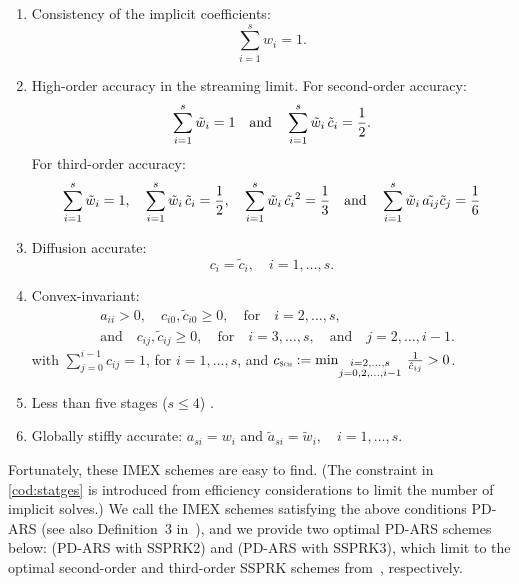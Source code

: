 \begin{enumerate}
    \item Consistency of the implicit coefficients:
    \begin{equation}
      \sum_{i=1}^{s}w_{i}=1.
    \end{equation}
    \item High-order accuracy in the streaming limit.
    For second-order accuracy:
    \begin{equation}
      \sum_{i=1}^{s}\tilde{w}_{i}=1
      \quad\text{and}\quad
      \sum_{i=1}^{s}\tilde{w}_{i}\,\tilde{c}_{i}=\frac{1}{2}.
      \label{eq:orderConditionsEx}
    \end{equation}
    For third-order accuracy: 
    \begin{equation}
    \sum_{i=1}^{s}\tilde{w}_{i}=1,
          \quad
          \sum_{i=1}^{s}\tilde{w}_{i}\,\tilde{c}_{i}=\frac{1}{2},
          \quad
          \sum_{i=1}^{s}\tilde{w}_{i}\,\tilde{c_{i}}^2 = \frac{1}{3}
          \quad\text{and}\quad
          \sum_{i=1}^{s}\tilde{w}_{i}\,\tilde{a_{ij}}\tilde{c}_{j}= \frac{1}{6}
    \end{equation}
    \item Diffusion accurate:
    \begin{equation}
      c_{i}=\tilde{c}_{i}, \quad i=1,\ldots,s.
      \label{eq:diffusionCondition}
    \end{equation}
    \item Convex-invariant:
    \begin{align}
      &a_{ii}>0, \quad c_{i0},\tilde{c}_{i0}\ge0, \quad \text{for} \quad i=2,\ldots,s, \nonumber \\
      &\text{and} \quad c_{ij},\tilde{c}_{ij}\ge0, \quad \text{for} \quad i=3,\ldots,s, \quad\text{and}\quad j=2,\ldots,i-1.  
      \label{eq:convexInvariant}
    \end{align}
    with $\sum_{j=0}^{i-1}c_{ij}=1$, for $i=1,\ldots,s$, and $c_{\textnormal{\tiny\textsc{Sch}}}:=\min_{\substack{i = 2,\ldots,s \\ 
                  j = 0,2,\ldots,i-1}}\,\frac{1}{\hat{c}_{ij}}>0$.
    \item Less than five stages ($s\le4$) \label{cod:statges}.
    \item Globally stiffly accurate: $a_{si}=w_{i}$ and $\tilde{a}_{si}=\tilde{w}_{i},\quad i=1,\ldots,s$. 
\end{enumerate}
Fortunately, these IMEX schemes are easy to find.  
(The constraint in \eqref{cod:statges} is introduced from efficiency considerations to limit the number of implicit solves.)
We call the IMEX schemes satisfying the above conditions {PD-ARS} (see also Definition~3 in~\cite{chu_etal_2018}), and we provide two optimal PD-ARS schemes below: (PD-ARS with SSPRK2) and (PD-ARS with SSPRK3), which limit to the optimal second-order and third-order SSPRK schemes from~\cite{shuOsher_1988}, respectively. 

